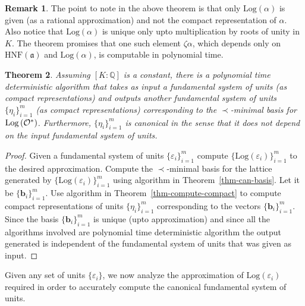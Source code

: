 \documentclass{article}
\newcommand{\Log}[1]{\mathrm{Log}\left(#1\right)}
\newcommand{\Ideal}[1]{\ensuremath{\mathfrak{#1}}}
\newtheorem{theorem}{Theorem}[section]
\theoremstyle{definition}\newtheorem{remark}[theorem]{Remark}
\renewcommand{\vector}[1]{\ensuremath{\mathbf{#1}}}
\begin{document}
\begin{remark}
The point to note in the above theorem is that only $\Log{\alpha}$ is
given (as a rational approximation) and not the compact representation
of $\alpha$. Also notice that $\Log{\alpha}$ is unique only upto
multiplication by roots of unity in $K$. The theorem promises that one
such element $\zeta\alpha$, which depends only on
$\textrm{HNF}(\Ideal{a})$ and $\Log{\alpha}$, is computable in
polynomial time.
\end{remark}

\begin{theorem}\label{thm-canonical-units}
  Assuming $[K:\mathbb{Q}]$ is a constant, there is a polynomial time
  deterministic algorithm that takes as input a fundamental system of
  units (as compact representations) and outputs another fundamental
  system of units $\{ \eta_i \}_{i=1}^m$ (as compact representations)
  corresponding to the $\prec$-minimal basis for $\Log{\cal{O}^*}$.
  Furthermore, $\{ \eta_i \}_{i=1}^m$ is canonical in the sense that
  it does not depend on the input fundamental system of units.
\end{theorem}
\begin{proof}
  Given a fundamental system of units $\{ \varepsilon_i\}_{i=1}^m$
  compute $\{ \Log{\varepsilon_i}\}_{i=1}^m$ to the desired
  approximation. Compute the $\prec$-minimal basis for the lattice
  generated by $\{ \Log{\varepsilon_i}\}_{i=1}^m$ using algorithm in
  Theorem~\ref{thm-can-basis}. Let it be $\{\vector{b}_i\}_{i=1}^m$.
  Use algorithm in Theorem~\ref{thm-compute-compact} to compute
  compact representations of units $\{ \eta_i\}_{i=1}^m$ corresponding
  to the vectors $\{ \vector{b}_i\}_{i=1}^m$.  Since the basis
  $\{\vector{b}_i\}_{i=1}^m$ is unique (upto approximation) and since
  all the algorithms involved are polynomial time deterministic
  algorithm the output generated is independent of the fundamental
  system of units that was given as input.
\end{proof}

Given any set of units $\{ \varepsilon_i \}$, we now analyze the
approximation of $\Log{\varepsilon_i}$ required in order to accurately
compute the canonical fundamental system of units.
\end{document}
